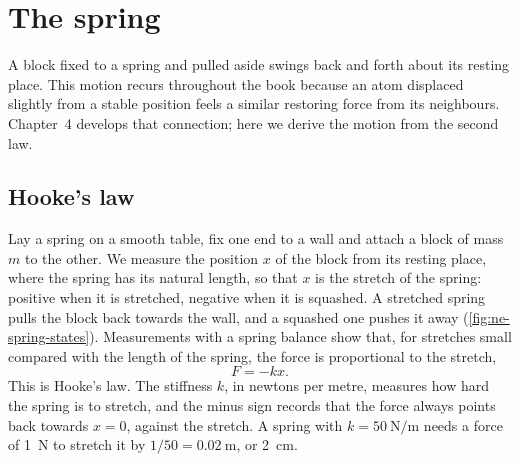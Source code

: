 \section{The spring}
\label{sec:ne-spring}

A block fixed to a spring and pulled aside swings back and forth about
its resting place. This motion recurs throughout the book because an atom
displaced slightly from a stable position feels a similar restoring
force from its neighbours. Chapter~4 develops that connection; here we derive the
motion from the second law.

\subsection*{Hooke's law}

Lay a spring on a smooth table, fix one end to a wall and attach a block
of mass $m$ to the other. We measure the position $x$ of the block from
its resting place, where the spring has its natural length, so that $x$
is the stretch of the spring: positive when it is stretched, negative
when it is squashed. A stretched spring pulls the block back towards the
wall, and a squashed one pushes it away (\cref{fig:ne-spring-states}).
Measurements with a spring balance show that, for stretches small
compared with the length of the spring, the force is proportional to the
stretch,
\begin{equation*}
   F = -kx .
\end{equation*}
This is Hooke's law. The stiffness $k$, in newtons per metre, measures how
hard the spring is to stretch, and the minus sign records that the force
always points back towards $x = 0$, against the stretch. A spring with $k
= \SI{50}{\newton\per\metre}$ needs a force of \SI{1}{\newton} to stretch
it by $1/50 = \SI{0.02}{\metre}$, or \SI{2}{\centi\metre}.


